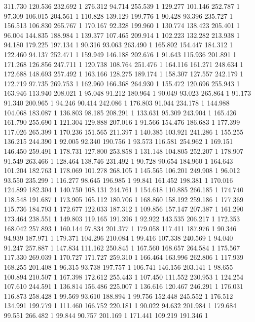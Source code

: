 	311.730	120.536	232.692	1
	276.312	94.714	255.539	1
	129.277	101.146	252.787	1
	97.309	106.015	204.561	1
	110.828	139.129	199.776	1
	90.428	93.396	235.727	1
	156.513	106.830	265.767	1
	170.167	92.328	199.960	1
	130.774	138.423	205.401	1
	96.004	144.835	188.984	1
	139.377	107.465	209.914	1
	102.223	132.282	213.938	1
	94.180	179.225	197.134	1
	90.316	93.063	263.490	1
	165.802	154.447	184.312	1
	122.460	94.137	252.471	1
	159.949	146.188	202.676	1
	91.643	115.936	201.891	1
	171.268	126.856	247.711	1
	120.738	108.764	251.476	1
	164.116	161.271	248.634	1
	172.688	148.693	257.492	1
	163.166	128.275	189.174	1
	158.307	127.557	242.179	1
	172.719	97.735	269.753	1
	162.960	166.368	264.930	1
	155.472	120.696	255.943	1
	163.946	113.940	208.021	1
	95.048	91.212	180.964	1
	90.049	93.023	265.864	1
	91.173	91.340	200.965	1
	94.246	90.414	242.086	1
	176.803	91.044	234.178	1
	144.988	104.068	183.087	1
	136.803	98.185	208.291	1
	133.631	95.309	243.904	1
	165.426	161.790	255.690	1
	121.304	129.888	207.016	1
	91.566	154.476	186.683	1
	177.399	117.026	265.399	1
	170.236	151.565	211.397	1
	140.385	103.921	241.286	1
	155.255	136.215	244.390	1
	92.005	92.340	190.756	1
	93.573	116.581	254.962	1
	169.151	146.450	259.491	1
	178.731	127.800	253.858	1
	131.148	104.805	252.207	1
	178.907	91.549	263.466	1
	128.464	138.746	231.492	1
	90.728	90.654	184.960	1
	164.643	101.204	182.763	1
	178.069	101.278	268.105	1
	145.565	106.201	249.908	1
	96.012	93.550	235.299	1
	116.277	98.645	196.985	1
	99.841	161.452	198.381	1
	170.016	124.899	182.304	1
	140.750	108.131	244.761	1
	154.618	110.885	266.185	1
	174.740	118.548	191.687	1
	173.905	165.112	180.706	1
	168.860	158.192	259.186	1
	177.369	115.736	184.793	1
	172.677	122.033	187.312	1
	109.856	157.147	207.387	1
	161.290	173.464	238.551	1
	149.803	119.165	191.396	1
	92.922	143.535	206.217	1
	172.353	168.042	257.893	1
	160.144	97.834	201.377	1
	179.058	117.411	187.976	1
	90.346	94.939	187.971	1
	179.371	104.296	210.084	1
	99.416	107.338	240.569	1
	94.040	91.247	257.887	1
	147.834	111.162	250.845	1
	167.560	168.657	264.584	1
	175.567	117.330	269.039	1
	170.727	171.727	259.310	1
	166.464	163.996	262.806	1
	117.939	168.255	201.408	1
	96.315	93.738	197.757	1
	106.741	146.156	203.141	1
	98.655	100.894	210.507	1
	167.398	172.612	255.443	1
	107.450	111.552	230.953	1
	124.254	107.610	244.591	1
	136.814	156.486	225.007	1
	136.616	120.467	246.291	1
	176.031	116.873	258.428	1
	99.569	93.610	188.894	1
	99.756	152.448	245.552	1
	176.512	134.991	199.779	1
	111.460	166.752	220.181	1
	90.022	94.632	201.984	1
	179.684	99.551	266.482	1
	99.844	90.757	201.169	1
	171.441	109.219	191.346	1

